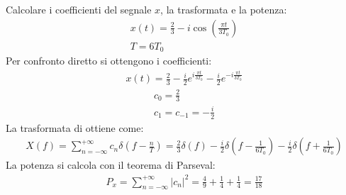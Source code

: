 \documentclass{article}
\begin{document}
Calcolare i coefficienti del segnale $x$, la trasformata e la potenza:
\begin{gather*}
    x(t)=\displaystyle\frac{2}{3}-i\cos\left(\frac{\pi t}{3T_0}\right)\\
    T=6T_0
\end{gather*}
Per confronto diretto si ottengono i coefficienti:
\begin{gather*}
    x(t)=\displaystyle\frac{2}{3}-\frac{i}{2}e^{i\frac{\pi t}{3T_0}}-\frac{i}{2}e^{-i\frac{\pi t}{3T_0}}
\end{gather*}
\begin{gather}
    c_0=\displaystyle\frac{2}{3}\\
    c_{1}=c_{-1}=\displaystyle-\frac{i}{2}
\end{gather}
La trasformata di ottiene come:
\begin{gather}
    X(f)=\displaystyle\sum_{n=-\infty}^{+\infty}c_n\delta\left(f-\frac{n}{T}\right)=\frac{2}{3}\delta(f)-\frac{i}{2}\delta\left(f-\frac{1}{6T_0}\right)-\frac{i}{2}\delta\left(f+\frac{1}{6T_0}\right)
\end{gather}
La potenza si calcola con il teorema di Parseval:
\begin{gather}
    P_x=\displaystyle\sum_{n=-\infty}^{+\infty}|c_n|^2=\frac{4}{9}+\frac{1}{4}+\frac{1}{4}=\frac{17}{18}
\end{gather}
\end{document}
